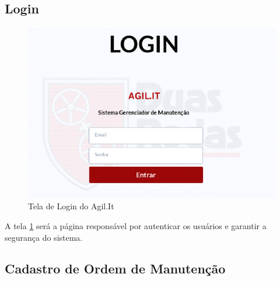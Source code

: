 {\subsection{Login}

\begin{figure}[htb]
	\caption{\label{web_login}Tela de Login do Agil.It}
	\begin{center}
		\includegraphics[scale=0.70]{./Figuras/web/login.png}
	\end{center}
\end{figure}

A tela \ref{web_login} será a página responsável por autenticar os usuários e garantir a segurança do sistema.


\subsection{Cadastro de Ordem de Manutenção}

}
